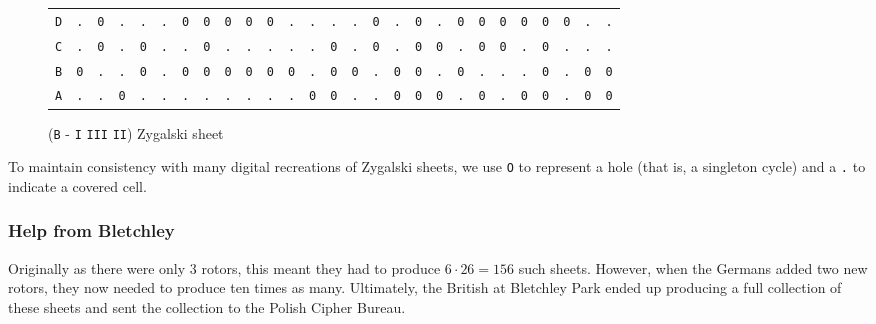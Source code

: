 \begin{figure}[H]
\begin{center}
{\begin{tabular}{c|cccccccccccccccccccccccccc}
				\texttt{D} & \texttt{.} & \texttt{0} & \texttt{.} &
				\texttt{.} & \texttt{.} & \texttt{0} & \texttt{0} &
				\texttt{0} & \texttt{0} & \texttt{0} & \texttt{.} &
				\texttt{.} & \texttt{.} & \texttt{.} & \texttt{0} &
				\texttt{.} & \texttt{0} & \texttt{.} & \texttt{0} &
				\texttt{0} & \texttt{0} & \texttt{0} & \texttt{0} &
				\texttt{0} & \texttt{.} & \texttt{.}                             \\
				\texttt{C} & \texttt{.} & \texttt{0} & \texttt{.} &
				\texttt{0} & \texttt{.} & \texttt{.} & \texttt{0} &
				\texttt{.} & \texttt{.} & \texttt{.} & \texttt{.} &
				\texttt{.} & \texttt{0} & \texttt{.} & \texttt{0} &
				\texttt{.} & \texttt{0} & \texttt{0} & \texttt{.} &
				\texttt{0} & \texttt{0} & \texttt{.} & \texttt{0} &
				\texttt{.} & \texttt{.} & \texttt{.}                             \\
				\texttt{B} & \texttt{0} & \texttt{.} & \texttt{.} &
				\texttt{0} & \texttt{.} & \texttt{0} & \texttt{0} &
				\texttt{0} & \texttt{0} & \texttt{0} & \texttt{0} &
				\texttt{.} & \texttt{0} & \texttt{0} & \texttt{.} &
				\texttt{0} & \texttt{0} & \texttt{.} & \texttt{0} &
				\texttt{.} & \texttt{.} & \texttt{.} & \texttt{0} &
				\texttt{.} & \texttt{0} & \texttt{0}                             \\
				\texttt{A} & \texttt{.} & \texttt{.} & \texttt{0} &
				\texttt{.} & \texttt{.} & \texttt{.} & \texttt{.} &
				\texttt{.} & \texttt{.} & \texttt{.} & \texttt{.} &
				\texttt{0} & \texttt{0} & \texttt{.} & \texttt{.} &
				\texttt{0} & \texttt{0} & \texttt{0} & \texttt{.} &
				\texttt{0} & \texttt{.} & \texttt{0} & \texttt{0} &
				\texttt{.} & \texttt{0} & \texttt{0}                             \\
			\end{tabular}}
	\end{center}
	\caption{(\texttt{B} - \texttt{I} \texttt{III} \texttt{II}) Zygalski sheet}
	\label{fig:zygalski_sheet}
\end{figure}
\noindent To maintain consistency with many digital recreations of
Zygalski sheets, we use \texttt{O} to represent a hole (that is, a
singleton cycle) and a \texttt{.} to indicate a covered cell.
\subsubsection{Help from Bletchley}
Originally as there were only $3$ rotors, this meant they had to
produce $6\cdot 26 = 156$ such sheets. However, when the Germans
added two new rotors, they now needed to produce ten times as many.
Ultimately, the British at Bletchley Park ended up producing a full
collection of these sheets and sent the collection to the Polish Cipher Bureau.

